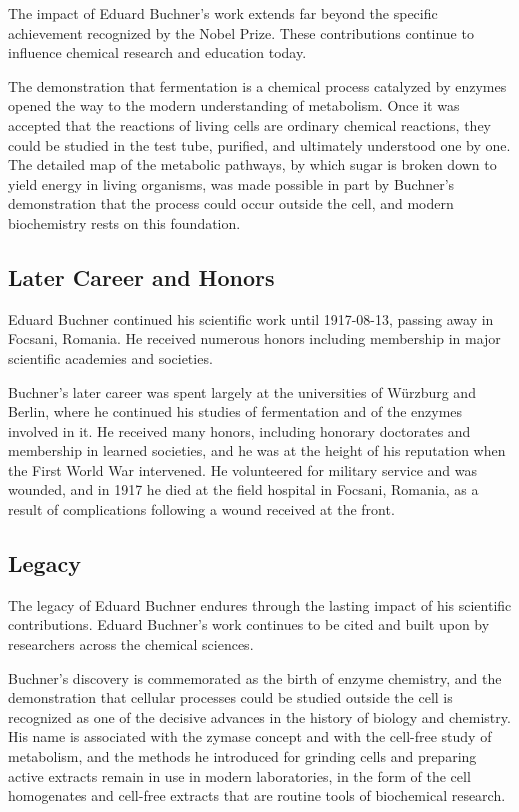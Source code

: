 The impact of Eduard Buchner's work extends far beyond the specific achievement recognized by the Nobel Prize.
These contributions continue to influence chemical research and education today.

The demonstration that fermentation is a chemical process catalyzed by enzymes opened the way to the modern understanding of metabolism. Once it was accepted that the reactions of living cells are ordinary chemical reactions, they could be studied in the test tube, purified, and ultimately understood one by one. The detailed map of the metabolic pathways, by which sugar is broken down to yield energy in living organisms, was made possible in part by Buchner's demonstration that the process could occur outside the cell, and modern biochemistry rests on this foundation.

\subsection*{Later Career and Honors}

Eduard Buchner continued his scientific work until 1917-08-13, passing away in Focsani, Romania.
He received numerous honors including membership in major scientific academies and societies.

Buchner's later career was spent largely at the universities of Würzburg and Berlin, where he continued his studies of fermentation and of the enzymes involved in it. He received many honors, including honorary doctorates and membership in learned societies, and he was at the height of his reputation when the First World War intervened. He volunteered for military service and was wounded, and in 1917 he died at the field hospital in Focsani, Romania, as a result of complications following a wound received at the front.

\subsection*{Legacy}

The legacy of Eduard Buchner endures through the lasting impact of his scientific contributions.
Eduard Buchner's work continues to be cited and built upon by researchers across the chemical sciences.

Buchner's discovery is commemorated as the birth of enzyme chemistry, and the demonstration that cellular processes could be studied outside the cell is recognized as one of the decisive advances in the history of biology and chemistry. His name is associated with the zymase concept and with the cell-free study of metabolism, and the methods he introduced for grinding cells and preparing active extracts remain in use in modern laboratories, in the form of the cell homogenates and cell-free extracts that are routine tools of biochemical research.


